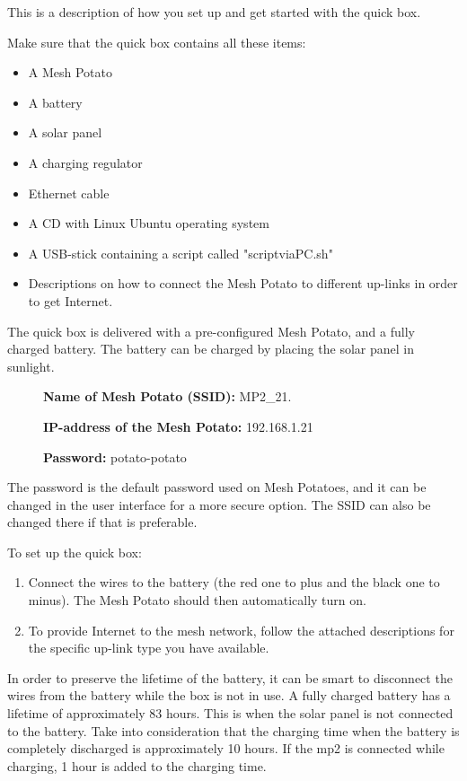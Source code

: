 This is a description of how you set up and get started with the \gls{quick} box. 

Make sure that the \gls{quick} box contains all these items: 
\begin{itemize}
\item A Mesh Potato
\item A battery
\item A solar panel
\item A charging regulator
\item Ethernet cable
\item A CD with Linux Ubuntu operating system
\item A USB-stick containing a script called "scriptviaPC.sh"
\item Descriptions on how to connect the Mesh Potato to different up-links in order to get Internet. 
\end{itemize}

The \gls{quick} box is delivered with a pre-configured Mesh Potato, and a fully charged battery. The battery can be charged by placing the solar panel in sunlight. 

\begin{description}
\item[] \textbf{Name of Mesh Potato (SSID):} MP2_21.
\item[] \textbf{IP-address of the Mesh Potato:} 192.168.1.21
\item[] \textbf{Password:} potato-potato 
\end{description}

The password is the default password used on Mesh Potatoes, and it can be changed in the user interface for a more secure option. The SSID can also be changed there if that is preferable. 

To set up the \gls{quick} box: 
\begin{enumerate}
\item Connect the wires to the battery (the red one to plus and the black one to minus). The Mesh Potato should then automatically turn on. 
\item To provide Internet to the mesh network, follow the attached descriptions for the specific up-link type you have available. 
\end{enumerate} 

In order to preserve the lifetime of the battery, it can be smart to disconnect the wires from the battery while the box is not in use. A fully charged battery has a lifetime of approximately 83 hours. This is when the solar panel is not connected to the battery. Take into consideration that the charging time when the battery is completely discharged is approximately 10 hours. If the \gls{mp2} is connected while charging, 1 hour is added to the charging time. 

